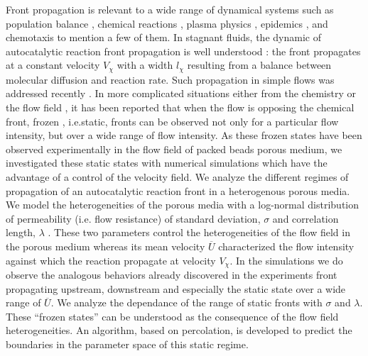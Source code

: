 \documentclass[doublecol]{epl2}
\begin{document}
Front propagation is relevant to a wide range of dynamical systems such as population balance \cite{fisher37,kolmogoroff37}, chemical reactions \cite{scott94}, plasma physics \cite{beule98}, epidemics \cite{russell04}, and chemotaxis \cite{Adler66} to mention a few of them. In stagnant fluids, the dynamic of autocatalytic reaction front propagation is well understood \cite{fisher37,kolmogoroff37,scott94} :
the front propagates at a constant velocity $V_{\chi}$ with a width $l_{\chi}$ resulting from a balance between molecular diffusion and reaction rate.
Such propagation in simple flows was addressed recently \cite{edwards02,leconte03}.
In more complicated situations either from the chemistry \cite{kaern02,koptyug08} or the flow field \cite{schwartz08,atis12,atis12b},
it has been reported that when the flow is opposing the chemical front, frozen , i.e.static, fronts can be observed not only for a particular flow intensity, but over a wide range of flow intensity. As these frozen states have been observed
experimentally in the flow field of packed beads porous medium, we investigated these static states with numerical simulations which have the advantage of a control of the velocity field.
We analyze the different regimes of propagation of an autocatalytic reaction front in a heterogenous porous media. We model the heterogeneities of the porous media with a log-normal distribution of permeability (i.e. flow resistance) of standard deviation, $\sigma$ and correlation length, $\lambda$ \cite{matheron67,talon03}.
These two parameters control the heterogeneities of the flow field in the porous medium whereas its mean velocity $\overline{U}$ characterized the flow intensity against which the reaction propagate at velocity $V_{\chi}$.  In the simulations we do observe the analogous behaviors already discovered in the experiments \cite{atis12,atis12b} front propagating upstream, downstream and especially the static state over a wide range of $\overline{U}$. We analyze the dependance of the range of static fronts
with $\sigma$ and $\lambda$.   These ``frozen states'' can be understood as the consequence of the flow field heterogeneities.
An algorithm, based on percolation, is developed  to predict the boundaries in the parameter space of this static regime.

\end{document}
